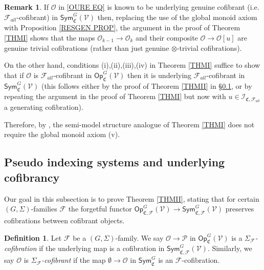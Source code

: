 \documentclass[a4paper,10pt
]{article}%
\numberwithin{equation}{section}
\numberwithin{figure}{section}
\theoremstyle{definition} %
\newtheorem{definition}[equation]{Definition}%
\newtheorem{remark}[equation]{Remark}%
\newcommand{\Sym}{\ensuremath{\mathsf{Sym}}}%
\newcommand{\Op}{\mathsf{Op}}%
\newcommand{\F}{\ensuremath{\mathcal F}}
\newcommand{\V}{\ensuremath{\mathcal V}}
\renewcommand{\O}{\ensuremath{\mathcal O}}
\renewcommand{\P}{\ensuremath{\mathcal P}}
\newcommand{\1}{\ensuremath{\mathbbm 1}}%
\begin{document}
\begin{remark}\label{THMISM REM}
	If $\O$ in \eqref{OURE EQ}
	is known to be underlying genuine cofibrant
	(i.e. $\F_{all}$-cofibrant) in 
	$\mathsf{Sym}^{G}_{\mathfrak{C}}(\V)$ 
	then, replacing the use of the global monoid axiom with 
	Proposition \ref{RESGEN PROP},
	the argument in the proof of Theorem \ref{THMI}
	shows that the maps
	$\O_{k-1} \to \O_k$
	and their composite
	$\O \to \O[u]$
	are genuine trivial cofibrations
	(rather than just genuine $\otimes$-trivial cofibrations).
	
	On the other hand, conditions (i),(ii),(iii),(iv) in Theorem \ref{THMI}
	suffice to show that if $\O$ is $\mathcal{F}_{all}$-cofibrant in 
	$\mathsf{Op}^G_{\mathfrak{C}}(\V)$
	then it is underlying $\mathcal{F}_{all}$-cofibrant in 
	$\mathsf{Sym}^G_{\mathfrak{C}}(\V)$
	(this follows either by the proof of Theorem \ref{THMII} in \S \ref{INDSYS_SEC},
	or by repeating the argument in the proof of Theorem \ref{THMI} but now with $u \in \mathcal{I}_{\mathfrak{C},\F_{all}}$
	a generating cofibration).
	
	Therefore, by \cite[Thm. 2.2.2]{WY18},
	the semi-model structure analogue of Theorem \ref{THMI}
	does not require the global monoid axiom (v).
\end{remark}







\subsection{Pseudo indexing systems and underlying cofibrancy}
\label{INDSYS_SEC}



Our goal in this subsection is to prove Theorem \ref{THMII},
stating that 
for certain $(G,\Sigma)$-families $\F$
the forgetful functor
$\Op^G_{\mathfrak C, \F}(\V) \to \Sym^G_{\mathfrak C, \F}(\V)$ preserves cofibrations between cofibrant objects.


\begin{definition}
	Let $\F$ be a $(G,\Sigma)$-family.
	We say $\O \to \P$ in $\Op^G_{\mathfrak C}(\V)$
	is a \textit{$\Sigma_\F$-cofibration}
	if the underlying map is a cofibration in $\Sym^G_{\mathfrak C, \F}(\V)$.
	Similarly, we say    
	$\O$ is \textit{$\Sigma_\F$-cofibrant} if 
	the map $\emptyset \to \O$
	in $\mathsf{Sym}^G_{\mathfrak{C}}$ is an $\F$-cofibration.
\end{definition}
\end{document}
